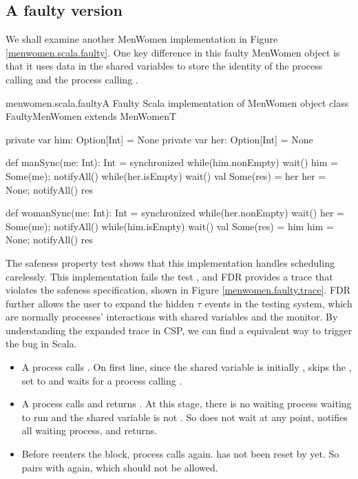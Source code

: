 \documentclass{article}
\begin{document}
\subsection{A faulty version}
We shall examine another MenWomen implementation in Figure \ref{menwomen.scala.faulty}. One key difference in this faulty MenWomen object is that it uses  data in the shared variables to store the identity of the process calling  and the process calling . 

\begin{scalafloat}{menwomen.scala.faulty}{A Faulty Scala implementation of MenWomen object}
class FaultyMenWomen extends MenWomenT{
  private var him: Option[Int] = None
  private var her: Option[Int] = None

  def manSync(me: Int): Int = synchronized{
    while(him.nonEmpty) wait()
    him = Some(me); notifyAll()
    while(her.isEmpty) wait()   
    val Some(res) = her
    her = None; notifyAll()
    res
  }

  def womanSync(me: Int): Int = synchronized{
    while(her.nonEmpty) wait()
    her = Some(me); notifyAll()
    while(him.isEmpty) wait()  
    val Some(res) = him
    him = None; notifyAll()
    res
  }
}
\end{scalafloat}

The safeness property test shows that this implementation handles scheduling carelessly. This implementation fails the test \CSPM{Spec2Thread [T= System2}, and FDR provides a trace that violates the safeness specification, shown in Figure \ref{menwomen.faulty.trace}. FDR further allows the user to expand the hidden $\tau$ events in the testing system, which are normally processes' interactions with shared variables and the monitor. By understanding the expanded trace in CSP, we can find a equivalent way to trigger the bug in Scala.


\begin{itemize}
  \item A process  calls . On first line, since the shared variable  is initially ,  skips the , set  to  and waits for a process calling .
  \item A process  calls  and returns . At this stage, there is no waiting process waiting to run  and the shared variable is not . So  does not wait at any point, notifies all waiting process, and returns.
  \item Before  reenters the  block, process  calls  again.  has not been reset by  yet. So  pairs with  again, which should not be allowed. 
\end{itemize}
\end{document}
